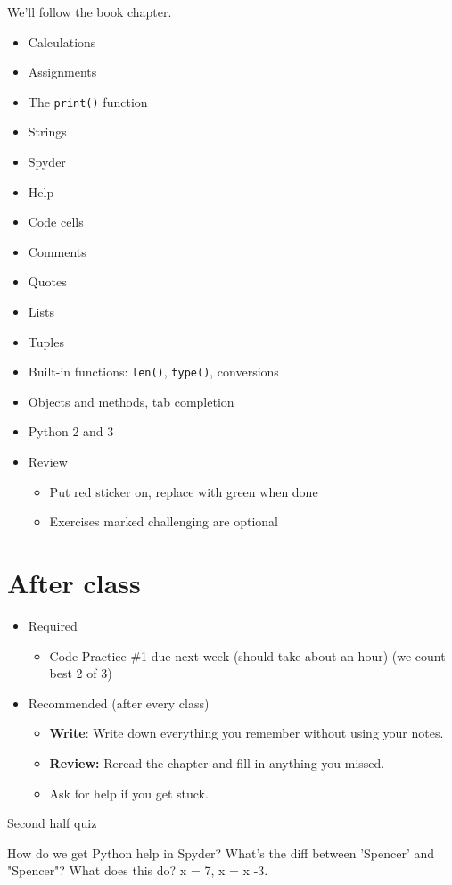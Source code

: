 We'll follow the book chapter.
\begin{itemize}
\item Calculations %
\item Assignments
\item The {\tt print()} function
\item Strings
\item Spyder
\item Help
\item Code cells
\item Comments
\item Quotes
\item Lists
\item Tuples
\item Built-in functions:  {\tt len()}, {\tt type()}, conversions
\item Objects and methods, tab completion
\item Python 2 and 3
\item Review
\begin{itemize}
\item Put red sticker on, replace with green when done
\item Exercises marked challenging are optional
\end{itemize}
\end{itemize}

\section*{After class}

\begin{itemize}
\item Required
\begin{itemize}
\item Code Practice \#1 due next week (should take about an hour) (we count best 2 of 3)
\end{itemize}
\item Recommended (after every class)
\begin{itemize}
\item {\bf Write}:  Write down everything you remember without using your notes.
\item {\bf Review:} Reread the chapter and fill in anything you missed.
\item Ask for help if you get stuck.
\end{itemize}
\end{itemize}

%



Second half quiz

How do we get Python help in Spyder?
What's the diff between 'Spencer' and "Spencer"?
What does this do?  x = 7, x = x -3.
